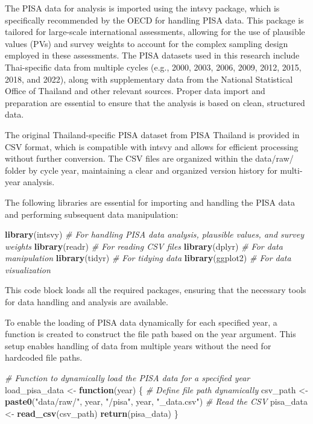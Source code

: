 \documentclass[
]{article}
\newenvironment{Shaded}{\begin{snugshade}}{\end{snugshade}}
\newcommand{\CommentTok}[1]{\textcolor[rgb]{0.56,0.35,0.01}{\textit{#1}}}
\newcommand{\ControlFlowTok}[1]{\textcolor[rgb]{0.13,0.29,0.53}{\textbf{#1}}}
\newcommand{\FunctionTok}[1]{\textcolor[rgb]{0.13,0.29,0.53}{\textbf{#1}}}
\newcommand{\NormalTok}[1]{#1}
\newcommand{\OtherTok}[1]{\textcolor[rgb]{0.56,0.35,0.01}{#1}}
\newcommand{\StringTok}[1]{\textcolor[rgb]{0.31,0.60,0.02}{#1}}
\begin{document}
The PISA data for analysis is imported using the intsvy package, which
is specifically recommended by the OECD for handling PISA data. This
package is tailored for large-scale international assessments, allowing
for the use of plausible values (PVs) and survey weights to account for
the complex sampling design employed in these assessments. The PISA
datasets used in this research include Thai-specific data from multiple
cycles (e.g., 2000, 2003, 2006, 2009, 2012, 2015, 2018, and 2022), along
with supplementary data from the National Statistical Office of Thailand
and other relevant sources. Proper data import and preparation are
essential to ensure that the analysis is based on clean, structured
data.

The original Thailand-specific PISA dataset from PISA Thailand is
provided in CSV format, which is compatible with intsvy and allows for
efficient processing without further conversion. The CSV files are
organized within the data/raw/ folder by cycle year, maintaining a clear
and organized version history for multi-year analysis.

The following libraries are essential for importing and handling the
PISA data and performing subsequent data manipulation:

\begin{Shaded}
\begin{Highlighting}[]
\FunctionTok{library}\NormalTok{(intsvy)     }\CommentTok{\# For handling PISA data analysis, plausible values, and survey weights}
\FunctionTok{library}\NormalTok{(readr)      }\CommentTok{\# For reading CSV files}
\FunctionTok{library}\NormalTok{(dplyr)      }\CommentTok{\# For data manipulation}
\FunctionTok{library}\NormalTok{(tidyr)      }\CommentTok{\# For tidying data}
\FunctionTok{library}\NormalTok{(ggplot2)    }\CommentTok{\# For data visualization}
\end{Highlighting}
\end{Shaded}

This code block loads all the required packages, ensuring that the
necessary tools for data handling and analysis are available.

To enable the loading of PISA data dynamically for each specified year,
a function is created to construct the file path based on the year
argument. This setup enables handling of data from multiple years
without the need for hardcoded file paths.

\begin{Shaded}
\begin{Highlighting}[]
\CommentTok{\# Function to dynamically load the PISA data for a specified year}
\NormalTok{load\_pisa\_data }\OtherTok{\textless{}{-}} \ControlFlowTok{function}\NormalTok{(year) \{}
    \CommentTok{\# Define file path dynamically}
\NormalTok{    csv\_path }\OtherTok{\textless{}{-}} \FunctionTok{paste0}\NormalTok{(}\StringTok{"data/raw/"}\NormalTok{, year, }\StringTok{"/pisa"}\NormalTok{, year, }\StringTok{"\_data.csv"}\NormalTok{)}
    \CommentTok{\# Read the CSV}
\NormalTok{    pisa\_data }\OtherTok{\textless{}{-}} \FunctionTok{read\_csv}\NormalTok{(csv\_path)}
    \FunctionTok{return}\NormalTok{(pisa\_data)}
\NormalTok{\}}
\end{Highlighting}
\end{Shaded}
\end{document}
